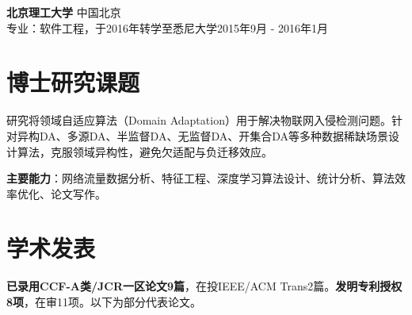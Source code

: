 \documentclass[UTF8,letterpaper,11pt]{article}
\begin{document}
\vspace{9pt}

\textbf{北京理工大学} \hfill 中国北京\\
专业：软件工程，于2016年转学至悉尼大学\hfill 2015年9月 - 2016年1月\\

\vspace{1pt}




\section{\textbf{博士研究课题}}

研究将领域自适应算法（Domain Adaptation）用于解决物联网入侵检测问题。针对异构DA、多源DA、半监督DA、无监督DA、开集合DA等多种数据稀缺场景设计算法，克服领域异构性，避免欠适配与负迁移效应。

\textbf{主要能力}：网络流量数据分析、特征工程、深度学习算法设计、统计分析、算法效率优化、论文写作。

\vspace{1pt}




\section{\textbf{学术发表}}

\textbf{已录用CCF-A类/JCR一区论文9篇}，在投IEEE/ACM Trans2篇。\textbf{发明专利授权8项}，在审11项。以下为部分代表论文。
\end{document}
